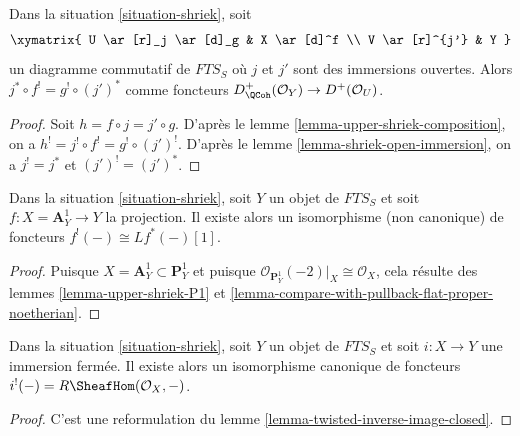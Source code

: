 \begin{lemma}
\label{lemma-restrict-before-or-after}
Dans la situation \ref{situation-shriek}, soit
$$
\xymatrix{
U \ar[r]_j \ar[d]_g & X \ar[d]^f \\
V \ar[r]^{j'} & Y
}
$$
un diagramme commutatif de $\textit{FTS}_S$ où $j$ et $j'$ sont des immersions ouvertes. Alors $j^* \circ f^! = g^! \circ (j')^*$ comme foncteurs $D^+_\QCoh(\mathcal{O}_Y) \to D^+(\mathcal{O}_U)$.
\end{lemma}

\begin{proof}
Soit $h = f \circ j = j' \circ g$. D'après le lemme \ref{lemma-upper-shriek-composition}, on a $h^! = j^! \circ f^! = g^! \circ (j')^!$. D'après le lemme \ref{lemma-shriek-open-immersion}, on a $j^! = j^*$ et $(j')^! = (j')^*$.
\end{proof}

\begin{lemma}
\label{lemma-shriek-affine-line}
Dans la situation \ref{situation-shriek}, soit $Y$ un objet de $\textit{FTS}_S$ et soit $f : X = \mathbf{A}^1_Y \to Y$ la projection. Il existe alors un isomorphisme (non canonique) de foncteurs $f^!(-) \cong Lf^*(-) [1]$.
\end{lemma}

\begin{proof}
Puisque $X = \mathbf{A}^1_Y \subset \mathbf{P}^1_Y$ et puisque $\mathcal{O}_{\mathbf{P}^1_Y}(-2)|_X \cong \mathcal{O}_X$, cela résulte des lemmes \ref{lemma-upper-shriek-P1} et \ref{lemma-compare-with-pullback-flat-proper-noetherian}.
\end{proof}

\begin{lemma}
\label{lemma-shriek-closed-immersion}
Dans la situation \ref{situation-shriek}, soit $Y$ un objet de $\textit{FTS}_S$ et soit $i : X \to Y$ une immersion fermée. Il existe alors un isomorphisme canonique de foncteurs $i^!(-) = R\SheafHom(\mathcal{O}_X, -)$.
\end{lemma}

\begin{proof}
C'est une reformulation du lemme \ref{lemma-twisted-inverse-image-closed}.
\end{proof}

